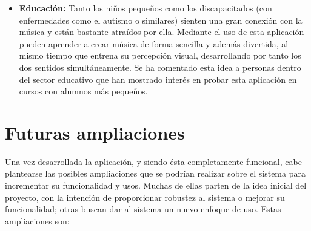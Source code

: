 \begin{itemize}
\item\textbf{Educación:} Tanto los niños pequeños como los discapacitados (con enfermedades como el autismo o similares) sienten una gran conexión con la música y están bastante atraídos por ella. Mediante el uso de esta aplicación pueden aprender a crear música de forma sencilla y además divertida, al mismo tiempo que entrena su percepción visual, desarrollando por tanto los dos sentidos simultáneamente. Se ha comentado esta idea a personas dentro del sector educativo que han mostrado interés en probar esta aplicación en cursos con alumnos más pequeños.

\end{itemize}

\section{Futuras ampliaciones}
\label{sec:ampliaciones}

Una vez desarrollada la aplicación, y siendo ésta completamente funcional, cabe plantearse las posibles ampliaciones que se podrían realizar sobre el sistema para incrementar su funcionalidad y usos. Muchas de ellas parten de la idea inicial del proyecto, con la intención de proporcionar robustez al sistema o mejorar su funcionalidad; otras buscan dar al sistema un nuevo enfoque de uso. Estas ampliaciones son:

